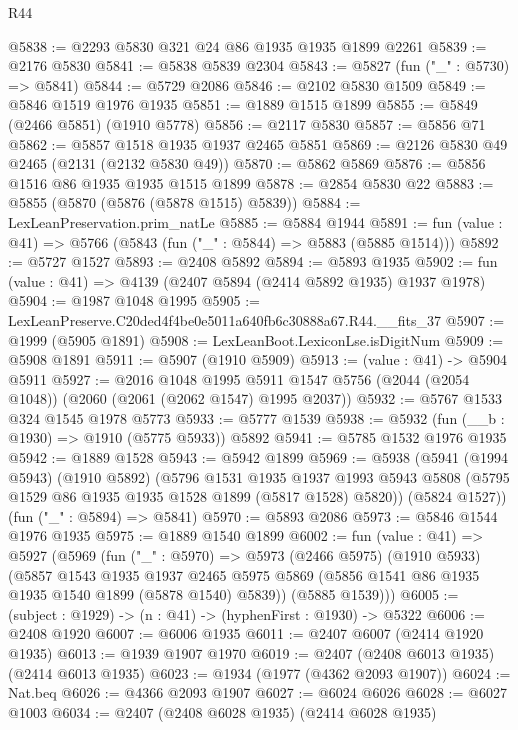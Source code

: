 \begin{lexlean}{R44}
\begin{coremodule}
@5838 := @2293 @5830 @321 @24 @86 @1935 @1935 @1899 @2261
@5839 := @2176 @5830
@5841 := @5838 @5839 @2304
@5843 := @5827 (fun ("_" : @5730) => @5841)
@5844 := @5729 @2086
@5846 := @2102 @5830 @1509
@5849 := @5846 @1519 @1976 @1935
@5851 := @1889 @1515 @1899
@5855 := @5849 (@2466 @5851) (@1910 @5778)
@5856 := @2117 @5830
@5857 := @5856 @71
@5862 := @5857 @1518 @1935 @1937 @2465 @5851
@5869 := @2126 @5830 @49 @2465 (@2131 (@2132 @5830 @49))
@5870 := @5862 @5869
@5876 := @5856 @1516 @86 @1935 @1935 @1515 @1899
@5878 := @2854 @5830 @22
@5883 := @5855 (@5870 (@5876 (@5878 @1515) @5839))
@5884 := LexLeanPreservation.prim_natLe
@5885 := @5884 @1944
@5891 := fun (value : @41) => @5766 (@5843 (fun ("_" : @5844) => @5883 (@5885 @1514)))
@5892 := @5727 @1527
@5893 := @2408 @5892
@5894 := @5893 @1935
@5902 := fun (value : @41) => @4139 (@2407 @5894 (@2414 @5892 @1935) @1937 @1978)
@5904 := @1987 @1048 @1995
@5905 := LexLeanPreserve.C20ded4f4be0e5011a640fb6c30888a67.R44.__fits_37
@5907 := @1999 (@5905 @1891)
@5908 := LexLeanBoot.LexiconLse.isDigitNum
@5909 := @5908 @1891
@5911 := @5907 (@1910 @5909)
@5913 := (value : @41) -> @5904 @5911
@5927 := @2016
    @1048
    @1995
    @5911
    @1547
    @5756
    (@2044 (@2054 @1048))
    (@2060 (@2061 (@2062 @1547) @1995 @2037))
@5932 := @5767 @1533 @324 @1545 @1978 @5773
@5933 := @5777 @1539
@5938 := @5932 (fun (__b : @1930) => @1910 (@5775 @5933)) @5892
@5941 := @5785 @1532 @1976 @1935
@5942 := @1889 @1528
@5943 := @5942 @1899
@5969 := @5938
    (@5941
      (@1994 @5943)
      (@1910 @5892)
      (@5796
        @1531
        @1935
        @1937
        @1993
        @5943
        @5808
        (@5795 @1529 @86 @1935 @1935 @1528 @1899 (@5817 @1528) @5820))
      (@5824 @1527))
    (fun ("_" : @5894) => @5841)
@5970 := @5893 @2086
@5973 := @5846 @1544 @1976 @1935
@5975 := @1889 @1540 @1899
@6002 := fun (value : @41) =>
  @5927
    (@5969
      (fun ("_" : @5970) =>
      @5973
        (@2466 @5975)
        (@1910 @5933)
        (@5857
          @1543
          @1935
          @1937
          @2465
          @5975
          @5869
          (@5856 @1541 @86 @1935 @1935 @1540 @1899 (@5878 @1540) @5839))
        (@5885 @1539)))
@6005 := (subject : @1929) -> (n : @41) -> (hyphenFirst : @1930) -> @5322
@6006 := @2408 @1920
@6007 := @6006 @1935
@6011 := @2407 @6007 (@2414 @1920 @1935)
@6013 := @1939 @1907 @1970
@6019 := @2407 (@2408 @6013 @1935) (@2414 @6013 @1935)
@6023 := @1934 (@1977 (@4362 @2093 @1907))
@6024 := Nat.beq
@6026 := @4366 @2093 @1907
@6027 := @6024 @6026
@6028 := @6027 @1003
@6034 := @2407 (@2408 @6028 @1935) (@2414 @6028 @1935)

\end{coremodule}
\end{lexlean}
